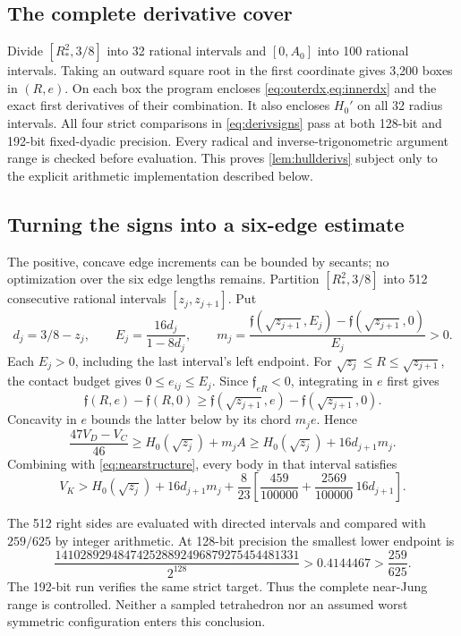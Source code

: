 \documentclass[11pt]{article}
\numberwithin{equation}{section}
\theoremstyle{definition}\newtheorem{definition}[theorem]{Definition}
\theoremstyle{remark}\newtheorem{remark}[theorem]{Remark}
\newcommand{\RS}{R_*}
\begin{document}
\subsection{The complete derivative cover}
Divide $[\RS^2,3/8]$ into 32 rational intervals and $[0,A_0]$ into 100
rational intervals. Taking an outward square root in the first coordinate
gives 3,200 boxes in $(R,e)$. On each box the program encloses
\cref{eq:outerdx,eq:innerdx} and the exact first derivatives of their
combination. It also encloses $H_0'$ on all 32 radius intervals. All four
strict comparisons in \cref{eq:derivsigns} pass at both 128-bit and 192-bit
fixed-dyadic precision. Every radical and inverse-trigonometric argument
range is checked before evaluation. This proves \cref{lem:hullderivs}
subject only to the explicit arithmetic implementation described below.

\subsection{Turning the signs into a six-edge estimate}
The positive, concave edge increments can be bounded by secants; no
optimization over the six edge lengths remains. Partition
$[\RS^2,3/8]$ into 512 consecutive rational intervals
$[z_j,z_{j+1}]$. Put
\[
 d_j=3/8-z_j,\qquad E_j=\frac{16d_j}{1-8d_j},\qquad
 m_j=\frac{\mathfrak f(\sqrt{z_{j+1}},E_j)
              -\mathfrak f(\sqrt{z_{j+1}},0)}{E_j}>0.
\]
Each $E_j>0$, including the last interval's left endpoint. For
$\sqrt{z_j}\le R\le\sqrt{z_{j+1}}$, the contact budget gives $0\le e_{ij}\le E_j$.
Since $\mathfrak f_{eR}<0$, integrating in $e$ first gives
\[
 \mathfrak f(R,e)-\mathfrak f(R,0)
 \ge\mathfrak f(\sqrt{z_{j+1}},e)-\mathfrak f(\sqrt{z_{j+1}},0).
\]
Concavity in $e$ bounds the latter below by its chord $m_je$. Hence
\[
 \frac{47V_D-V_C}{46}
 \ge H_0(\sqrt{z_j})+m_j A
 \ge H_0(\sqrt{z_j})+16d_{j+1}m_j.
\]
Combining with \cref{eq:nearstructure}, every body in that interval satisfies
\begin{equation}\label{eq:bucket}
 V_K>H_0(\sqrt{z_j})+16d_{j+1}m_j
 +\frac8{23}\left[\frac{459}{100000}
       +\frac{2569}{100000}\,16d_{j+1}\right].
\end{equation}

The 512 right sides are evaluated with directed intervals and compared
with $259/625$ by integer arithmetic. At 128-bit precision the smallest
lower endpoint is
\begin{equation}\label{eq:nearminimum}
 \frac{141028929484742528892496879275454481331}{2^{128}}
 >0.4144467>\frac{259}{625}.
\end{equation}
The 192-bit run verifies the same strict target. Thus the complete
near-Jung range is controlled. Neither a sampled tetrahedron nor an assumed
worst symmetric configuration enters this conclusion.
\end{document}
